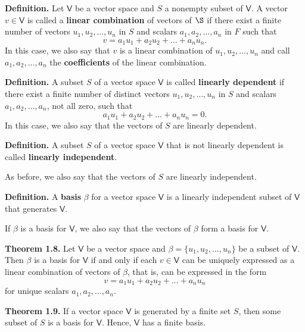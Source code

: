\documentclass{article}
\newcommand{\0}{\mathit{0}}
\begin{document}
\textbf{Definition.}
Let $\mathsf{V}$ be a vector space and $S$ a nonempty subset of
$\mathsf{V}$. A vector $v \in \mathsf{V}$ is called a \textbf{linear combination}
of vectors of $\S$ if there exist a finite number of vectors
$u_1, u_2, \dots, u_n$ in $S$ and scalars $a_1, a_2, \dots, a_n$
in $F$ such that
\[
    v = a_1 u_1 + a_2 u_2 + \dots + a_n u_n.
\]
In this case, we also say that $v$ is a linear combination of
$u_1, u_2, \dots, u_n$ and call $a_1, a_2, \dots, a_n$ the \textbf{coefficients}
of the linear combination.

\medskip

\textbf{Definition.}
A subset $S$ of a vector space $\mathsf{V}$ is called \textbf{linearly
    dependent} if there exist a finite number of distinct vectors
$u_1, u_2, \dots, u_n$ in $S$ and scalars $a_1, a_2, \dots, a_n$,
not all zero, such that
\[
    a_1 u_1 + a_2 u_2 + \dots + a_n u_n = \0.
\]
In this case, we also say that the vectors of $S$ are linearly dependent.

\medskip

\textbf{Definition.}
A subset $S$ of a vector space $\mathsf{V}$ that is not linearly
dependent is called \textbf{linearly independent}.

As before, we also say that the vectors of $S$ are linearly independent.

\medskip

\textbf{Definition.}
A \textbf{basis} $\beta$ for a vector space $\mathsf{V}$ is a linearly independent
subset of $\mathsf{V}$ that generates $\mathsf{V}$.

If $\beta$ is a basis for $\mathsf{V}$, we also say that the vectors of
$\beta$ form a basis for $\mathsf{V}$.

\medskip

\textbf{Theorem 1.8.} Let $\mathsf{V}$ be a vector space and
$\beta = \{ u_1, u_2, \dots, u_n \}$ be a subset of $\mathsf{V}$.
Then $\beta$ is a basis for $\mathsf{V}$ if and only if each
$v \in \mathsf{V}$ can be uniquely expressed as a linear
combination of vectors of $\beta$, that is, can be expressed in the form
\[
    v = a_1 u_1 + a_2 u_2 + \dots + a_n u_n
\]
for unique scalars $a_1, a_2, \dots, a_n$.

\medskip

\textbf{Theorem 1.9.} If a vector space $\mathsf{V}$ is generated by a finite
set $S$, then some subset of $S$ is a basis for $\mathsf{V}$.
Hence, $\mathsf{V}$ has a finite basis.

\medskip
\end{document}
